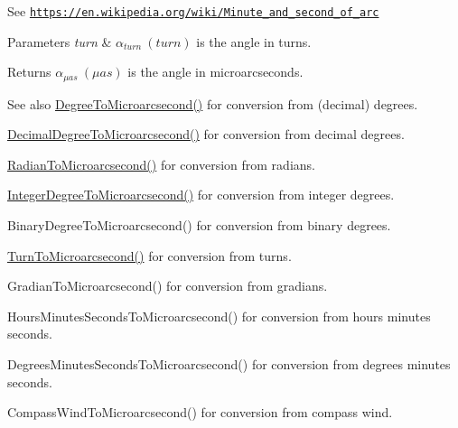 See \href{https://en.wikipedia.org/wiki/Minute_and_second_of_arc}{\tt https\+://en.\+wikipedia.\+org/wiki/\+Minute\+\_\+and\+\_\+second\+\_\+of\+\_\+arc} 
\begin{DoxyParams}{Parameters}
{\em turn} & $\alpha_{turn}\ (turn)$ is the angle in turns. \\
\hline
\end{DoxyParams}
\begin{DoxyReturn}{Returns}
$\alpha_{\mu as}\ (\mu as)$ is the angle in microarcseconds. 
\end{DoxyReturn}
\begin{DoxySeeAlso}{See also}
\mbox{\hyperlink{group___e_g_x_math-_angle_conversions-_degree_ga31b65388fe1b4656663b3d66b9d764e6}{Degree\+To\+Microarcsecond()}} for conversion from (decimal) degrees. 

\mbox{\hyperlink{group___e_g_x_math-_angle_conversions-_decimal_degree_ga6fa88456069907fd24716fa575517571}{Decimal\+Degree\+To\+Microarcsecond()}} for conversion from decimal degrees. 

\mbox{\hyperlink{group___e_g_x_math-_angle_conversions-_radian_ga3a515ca2838a305fa40750763f546a86}{Radian\+To\+Microarcsecond()}} for conversion from radians. 

\mbox{\hyperlink{group___e_g_x_math-_angle_conversions-_integer_degree_ga69179d6082764595c7014805e1f6b31e}{Integer\+Degree\+To\+Microarcsecond()}} for conversion from integer degrees. 

Binary\+Degree\+To\+Microarcsecond() for conversion from binary degrees. 

\mbox{\hyperlink{group___e_g_x_math-_angle_conversions-_turn_ga41a861a04d65aab05647b32142e6d80d}{Turn\+To\+Microarcsecond()}} for conversion from turns. 

Gradian\+To\+Microarcsecond() for conversion from gradians. 

Hours\+Minutes\+Seconds\+To\+Microarcsecond() for conversion from hours minutes seconds. 

Degrees\+Minutes\+Seconds\+To\+Microarcsecond() for conversion from degrees minutes seconds. 

Compass\+Wind\+To\+Microarcsecond() for conversion from compass wind. 
\end{DoxySeeAlso}
\mbox{\label{group___e_g_x_math-_angle_conversions-_turn_ga05d6fea8f8475831e93dd23f6196393f}} 
